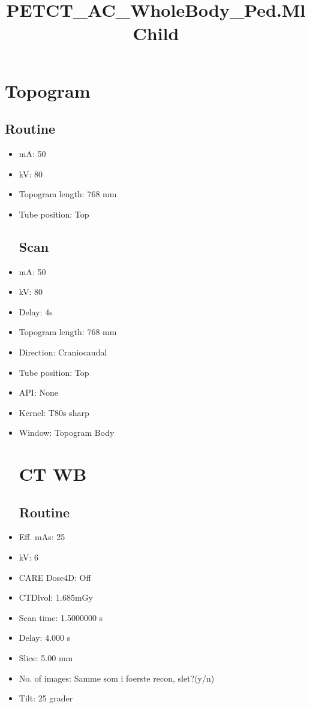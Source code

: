 \documentclass[12pt]{article}
\title{PETCT\_AC\_WholeBody\_Ped.MlChild}
\begin{document}
\maketitle
\newpage
\tableofcontents
\newpage
{}


\section{Topogram}
\subsection{Routine}
 \begin{itemize}\item mA: 50\item kV: 80\item Topogram length: 768 mm\item Tube position: Top
\subsection{Scan}
\item mA: 50\item kV: 80\item Delay: 4s\item Topogram length: 768 mm\item Direction: Craniocaudal\item Tube position: Top\item API: None\item Kernel: T80s sharp\item Window: Topogram Body
\section{CT WB}
\subsection{Routine}
\item Eff. mAs: 25\item kV: 6\item CARE Dose4D: Off\item CTDlvol: 1.685mGy\item Scan time: 1.5000000 s\item Delay: 4.000 s\item Slice: 5.00 mm\item No. of images: Samme som i foerste recon, slet?(y/n)\item Tilt: 25 grader

\end{itemize}
\end{document}
